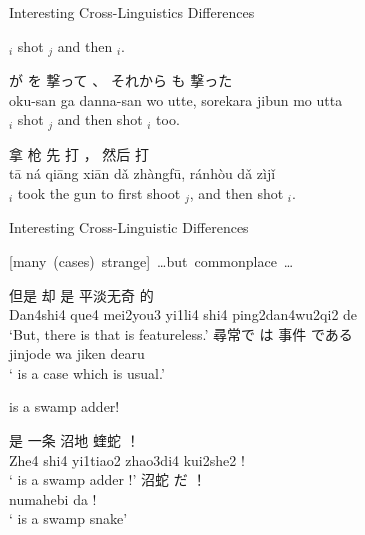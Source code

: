 \documentclass{beamer}
\begin{document}
\begin{frame}{Interesting Cross-Linguistics Differences}
  \begin{exe}
\ex {}$_i$ shot $_j$ and then $_i$.
\begin{xlist}
  
 \ex {} が  を 撃って 、 それから  も 撃った \\
     oku-san ga danna-san wo utte, sorekara jibun mo utta \\
     \trans {}$_i$ shot $_j$ and then shot $_i$ too.

\ex {} 拿 枪 先 打  ， 然后 打  \\
     tā ná qiāng xiān dǎ zhàngfū, ránhòu dǎ zìjǐ \\
     \trans {}$_i$ took the gun to first shoot $_j$, and then shot $_i$.
   \end{xlist}
 \end{exe}
\end{frame}

\begin{frame}{Interesting Cross-Linguistic Differences}
\begin{exe}
\ex\label{s:none}    \mbox{[many (cases) strange] \ldots but  commonplace \ldots}
\begin{xlist}
  \ex \gll      但是    却        是  平淡无奇      的 \\
  Dan4shi4 que4 mei2you3 yi1li4 shi4 ping2dan4wu2qi2 de \\
  \trans ‘But, there is  that is featureless.’
  \ex \gll  {} 尋常で は  事件 である \\
     jinjode   wa     jiken dearu \\
  \trans ‘ is a case which is  usual.’
\end{xlist}
  \ex\label{s:dif}   is a swamp adder!
  \begin{xlist}
    \ex \gll {}     是   一条      沼地        蝰蛇 ！ \\
    Zhe4 shi4 yi1tiao2 zhao3di4 kui2she2 ! \\
    \trans ` is a swamp adder !'
    \ex \gll  沼蛇 だ ！ \\
    numahebi da ! \\
    \trans `\wemp{$\phi$} is a swamp snake'
  \end{xlist}
\end{exe}
\end{frame}
\end{document}
